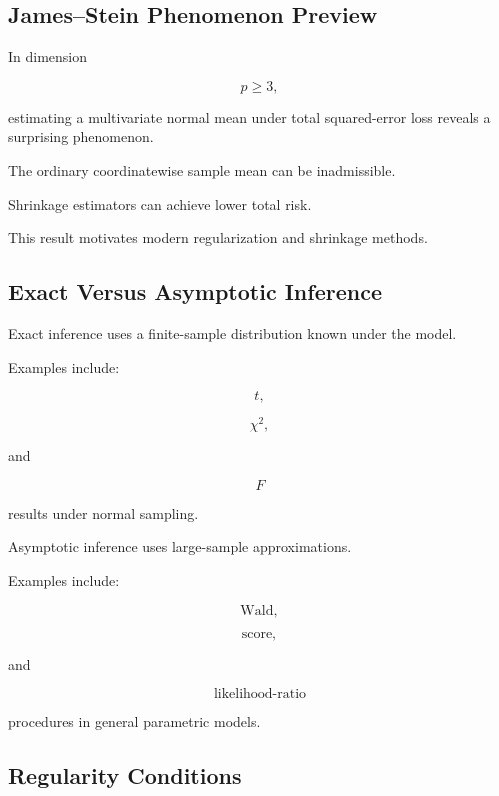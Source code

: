 \subsection{James--Stein Phenomenon Preview}
\label{subsec:james-stein-preview}

In dimension

\[
p\geq3,
\]

estimating a multivariate normal mean under total squared-error loss
reveals a surprising phenomenon.

The ordinary coordinatewise sample mean can be inadmissible.

Shrinkage estimators can achieve lower total risk.

This result motivates modern regularization and shrinkage methods.

\subsection{Exact Versus Asymptotic Inference}
\label{subsec:exact-versus-asymptotic-mathstat}

Exact inference uses a finite-sample distribution known under the model.

Examples include:

\[
\boxed{
t,
}
\]

\[
\boxed{
\chi^2,
}
\]

and

\[
\boxed{
F
}
\]

results under normal sampling.

Asymptotic inference uses large-sample approximations.

Examples include:

\[
\boxed{
\text{Wald},
}
\]

\[
\boxed{
\text{score},
}
\]

and

\[
\boxed{
\text{likelihood-ratio}
}
\]

procedures in general parametric models.

\subsection{Regularity Conditions}
\label{subsec:regularity-conditions}

